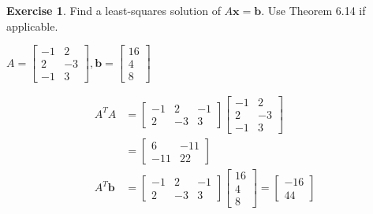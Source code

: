 \documentclass[10pt]{book}
\theoremstyle{definition}
\newtheorem{exercise}{Exercise}[section]
\newcommand{\vect}[1]{\ensuremath{\boldsymbol{\mathbf{#1}}}}
\newcommand{\Axb}{A\vect{x}=\vect{b}}
\begin{document}
\begin{exercise} %
	Find a least-squares solution of $\Axb$. Use Theorem 6.14 if applicable. \par
	$ A = \begin{bmatrix}-1&2\\2&-3\\-1&3\end{bmatrix}, 
	\vect{b} = \begin{bmatrix}16\\4\\8\end{bmatrix} $
	
	\begin{multicols}{2}
	\begin{align*}
	A^TA &= \begin{bmatrix}-1&2&-1\\2&-3&3\end{bmatrix}
	\begin{bmatrix}-1&2\\2&-3\\-1 &3\end{bmatrix} \\
	&= \begin{bmatrix}6&-11\\-11&22\end{bmatrix} \\[1em]
	A^T\vect{b} &= \begin{bmatrix}-1&2&-1\\2&-3&3\end{bmatrix} \begin{bmatrix}16\\4\\8\end{bmatrix} = \begin{bmatrix}-16\\44\end{bmatrix}
	\end{align*}
	
	\columnbreak
	\end{multicols}
\end{exercise}
\vfill


\newpage
\end{document}
